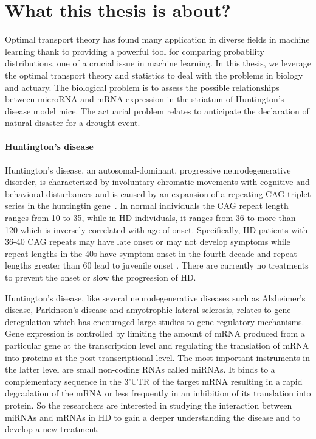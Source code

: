 \section{What this thesis is about?}

Optimal transport theory has found many application in diverse fields in machine learning thank to 
providing a powerful tool for comparing probability distributions, one of a crucial issue
in machine learning.  In this thesis, we leverage the optimal transport theory and statistics to deal with 
the problems in biology and actuary. The biological problem is to assess the possible relationships between microRNA and mRNA expression in the striatum of Huntington's disease model mice. The actuarial problem relates to anticipate the declaration of natural disaster for a drought event. 

\paragraph{ Huntington’s disease\\}
Huntington's disease, an autosomal-dominant, progressive neurodegenerative disorder, is characterized by involuntary chromatic movements with cognitive and behavioral disturbances and is caused by an expansion of a repeating CAG triplet series in the huntingtin gene~\cite{HD2007, MACDONALD1993971}.   In normal individuals the CAG repeat length ranges from 10 to 35, while in HD individuals, it ranges from 36 to more than 120 which is inversely correlated with age of onset. Specifically, HD patients with 36-40 CAG repeats may have late onset or may not develop symptoms while repeat lengths in the 40s have symptom onset in the fourth decade and repeat lengths greater than 60 lead to juvenile onset .
There are currently no treatments to prevent the onset or slow the progression of HD.

Huntington's disease, like several neurodegenerative diseases such as Alzheimer's disease, Parkinson's disease and amyotrophic lateral sclerosis, relates to gene deregulation which has encouraged large studies to gene regulatory mechanisms.
Gene expression is controlled by limiting the amount of mRNA produced from a particular gene at the transcription level and regulating the translation of mRNA into proteins at the post-transcriptional level. The most important instruments in the latter level  are small non-coding RNAs called miRNAs. It binds to a complementary sequence in the 3'UTR of the target mRNA resulting in a rapid degradation of the mRNA or less frequently in an inhibition of its translation into protein. So the researchers are interested in studying the interaction between miRNAs and mRNAs in HD to gain a deeper understanding the disease and to develop a new treatment.


